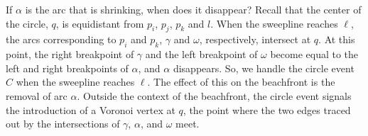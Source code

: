 \documentclass[12pt,twoside]{reedthesis}
\begin{document}
        If $\alpha$ is the arc that is shrinking, when does it disappear? Recall that the center of the circle, $q$, is equidistant from $p_{i}$, $p_{j}$, $p_{k}$ and $l$. When the sweepline reaches $\ell$, the arcs corresponding to $p_{i}$ and $p_{k}$, $\gamma$ and $\omega$, respectively, intersect at $q$. At this point, the right breakpoint of $\gamma$ and the left breakpoint of $\omega$ become equal to the left and right breakpoints of $\alpha$, and $\alpha$ disappears. So, we handle the circle event $C$ when the sweepline reaches $\ell$. The effect of this on the beachfront is the removal of arc $\alpha$. Outside the context of the beachfront, the circle event signals the introduction of a Voronoi vertex at $q$, the point where the two edges traced out by the intersections of $\gamma$, $\alpha$, and $\omega$ meet.\par

\end{document}
